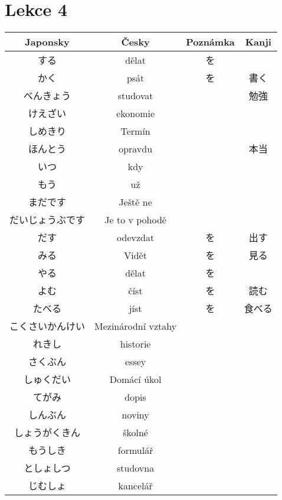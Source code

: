 \section{Lekce 4}
\begin{table}[H]
\centering
\begin{tabular}{cccc}
\hline
Japonsky & Česky                     & Poznámka                   & Kanji \\
\hline
する       & dělat              & を  &     \\
かく       & psát               & を  & 書く  \\
べんきょう    & studovat          & & 勉強      \\
けえざい     & ekonomie           &    &     \\
しめきり     & Termín             &    &     \\
ほんとう     & opravdu            && 本当      \\
いつ       & kdy                &    &     \\
もう       & už                 &    &     \\
まだです     & Ještě ne           &    &     \\
だいじょうぶです & Je to v pohodě     &    &     \\
だす       & odevzdat           & を  & 出す  \\
みる       & Vidět              & を  & 見る  \\
やる       & dělat              & を  &     \\
よむ       & číst               & を  & 読む  \\
たべる      & jíst               & を  & 食べる \\
こくさいかんけい & Mezinárodní vztahy &    &     \\
れきし      & historie           &    &     \\
さくぶん     & essey              &    &     \\
しゅくだい    & Domácí úkol        &    &     \\
てがみ      & dopis              &    &     \\
しんぶん     & noviny             &    &     \\
しょうがくきん  & školné             &    &     \\
もうしき     & formulář           &    &     \\
としょしつ    & studovna           &    &     \\
じむしょ     & kancelář           &    &     \\

\end{tabular}
\end{table}
